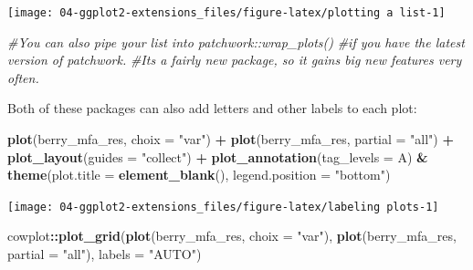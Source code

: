 \documentclass[
]{book}
\newenvironment{Shaded}{\begin{snugshade}}{\end{snugshade}}
\newcommand{\AttributeTok}[1]{\textcolor[rgb]{0.13,0.29,0.53}{#1}}
\newcommand{\CommentTok}[1]{\textcolor[rgb]{0.56,0.35,0.01}{\textit{#1}}}
\newcommand{\FunctionTok}[1]{\textcolor[rgb]{0.13,0.29,0.53}{\textbf{#1}}}
\newcommand{\NormalTok}[1]{#1}
\newcommand{\SpecialCharTok}[1]{\textcolor[rgb]{0.81,0.36,0.00}{\textbf{#1}}}
\newcommand{\StringTok}[1]{\textcolor[rgb]{0.31,0.60,0.02}{#1}}
\begin{document}
\begin{center}\texttt{[image: 04-ggplot2-extensions\_files/figure-latex/plotting a list-1]} \end{center}

\begin{Shaded}
\begin{Highlighting}[]
\CommentTok{\#You can also pipe your list into patchwork::wrap\_plots()}
\CommentTok{\#if you have the latest version of patchwork.}
\CommentTok{\#It\textquotesingle{}s a fairly new package, so it gains big new features very often.}
\end{Highlighting}
\end{Shaded}

Both of these packages can also add letters and other labels to each plot:

\begin{Shaded}
\begin{Highlighting}[]
\FunctionTok{plot}\NormalTok{(berry\_mfa\_res, }\AttributeTok{choix =} \StringTok{"var"}\NormalTok{) }\SpecialCharTok{+} \FunctionTok{plot}\NormalTok{(berry\_mfa\_res, }\AttributeTok{partial =} \StringTok{"all"}\NormalTok{) }\SpecialCharTok{+}
  \FunctionTok{plot\_layout}\NormalTok{(}\AttributeTok{guides =} \StringTok{"collect"}\NormalTok{) }\SpecialCharTok{+}
  \FunctionTok{plot\_annotation}\NormalTok{(}\AttributeTok{tag\_levels =} \StringTok{\textquotesingle{}A\textquotesingle{}}\NormalTok{) }\SpecialCharTok{\&}
  \FunctionTok{theme}\NormalTok{(}\AttributeTok{plot.title =} \FunctionTok{element\_blank}\NormalTok{(),}
        \AttributeTok{legend.position =} \StringTok{"bottom"}\NormalTok{)}
\end{Highlighting}
\end{Shaded}

\begin{center}\texttt{[image: 04-ggplot2-extensions\_files/figure-latex/labeling plots-1]} \end{center}

\begin{Shaded}
\begin{Highlighting}[]
\NormalTok{cowplot}\SpecialCharTok{::}\FunctionTok{plot\_grid}\NormalTok{(}\FunctionTok{plot}\NormalTok{(berry\_mfa\_res, }\AttributeTok{choix =} \StringTok{"var"}\NormalTok{),}
                   \FunctionTok{plot}\NormalTok{(berry\_mfa\_res, }\AttributeTok{partial =} \StringTok{"all"}\NormalTok{),}
                   \AttributeTok{labels =} \StringTok{"AUTO"}\NormalTok{)}
\end{Highlighting}
\end{Shaded}
\end{document}
